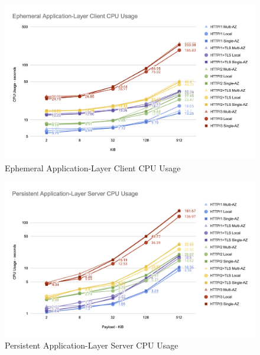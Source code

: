 \begin{figure}[h!]
    \centering
    \includegraphics[width=\linewidth]{figures/charts/Ephemeral Application-Layer Client CPU Usage.png}
    \caption{Ephemeral Application-Layer Client CPU Usage}
    \label{fig:ephemeral_client_application_cpu}
\end{figure}


\begin{figure}[h!]
    \centering
    \includegraphics[width=\linewidth]{figures/charts/Persistent Application-Layer Server CPU Usage.png}
    \caption{Persistent Application-Layer Server CPU Usage}
    \label{fig:persistent_server_application_cpu}
\end{figure}

